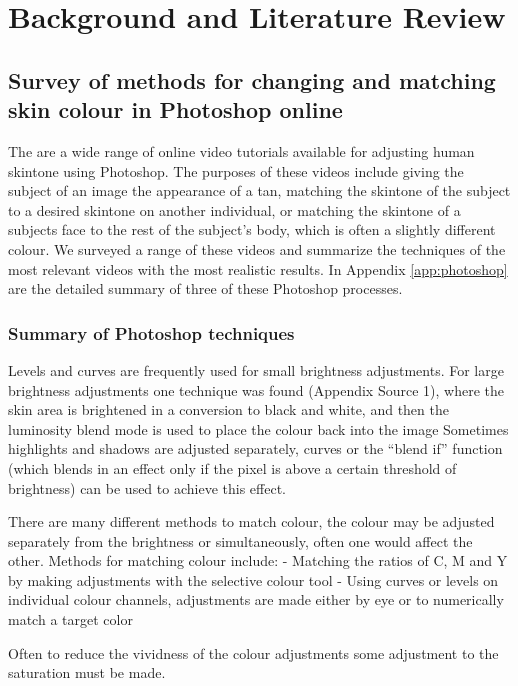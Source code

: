 \documentclass[12pt, a4paper]{article}
\begin{document}
\tableofcontents
\pagebreak

\listoffigures
\listoftables
\pagebreak

\section{Background and Literature Review}
\subsection{Survey of methods for changing and matching skin colour in Photoshop online}

The are a wide range of online video tutorials available for adjusting human skintone using Photoshop. The purposes of these videos include giving the subject of an image the appearance of a tan, matching the skintone of the subject to a desired skintone on another individual, or matching the skintone of a subjects face to the rest of the subject's body, which is often a slightly different colour. We surveyed a range of these videos and summarize the techniques of the most relevant videos with the most realistic results. In Appendix \ref{app:photoshop} are the detailed summary of three of these Photoshop processes.

\subsubsection{Summary of Photoshop techniques}

Levels and curves are frequently used for small brightness adjustments. For large brightness adjustments one technique was found (Appendix Source 1), where the skin area is brightened in a conversion to black and white, and then the luminosity blend mode is used to place the colour back into the image Sometimes highlights and shadows are adjusted separately, curves or the “blend if” function (which blends in an effect only if the pixel is above a certain threshold of brightness) can be used to achieve this effect.

There are many different methods to match colour, the colour may be adjusted separately from the brightness or simultaneously, often one would affect the other. Methods for matching colour include:
- Matching the ratios of C, M and Y by making adjustments with the selective colour tool
- Using curves or levels on individual colour channels, adjustments are made either by eye or to numerically match a target color

Often to reduce the vividness of the colour adjustments some adjustment to the saturation must be made.
\end{document}
